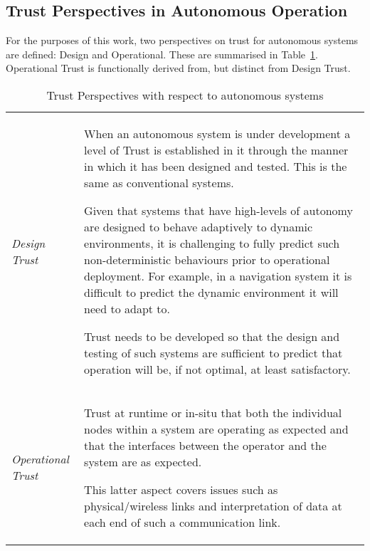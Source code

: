 \subsection{Trust Perspectives in Autonomous Operation}
For the purposes of this work, two perspectives on trust for autonomous systems are defined: Design and Operational.
These are summarised in Table~\ref{tab:trust_perspectives}.
Operational Trust is functionally derived from, but distinct from Design Trust.
\begin{table}
  \caption{Trust Perspectives with respect to autonomous systems}
  \label{tab:trust_perspectives}
  \begin{tabularx}{\textwidth}{p{3cm}X}\toprule
    \emph{Design Trust} & When an autonomous system is under development a level of Trust is established in it through the manner in which it has been designed and tested.
    This is the same as conventional systems.\par
    Given that systems that have high-levels of autonomy are designed to behave adaptively to dynamic environments, it is challenging to fully predict such non-deterministic behaviours prior to operational deployment.
    For example, in a navigation system it is difficult to predict the dynamic environment it will need to adapt to.\par
    Trust needs to be developed so that the design and testing of such systems are sufficient to predict that operation will be, if not optimal, at least satisfactory.
    \\
    \emph{Operational Trust} & Trust at runtime or in-situ that both the individual nodes within a system are operating as expected and that the interfaces between the operator and the system are as expected.
    \par
    This latter aspect covers issues such as physical/wireless links and interpretation of data at each end of such a communication link.
    \\\bottomrule
  \end{tabularx}
\end{table}
%
